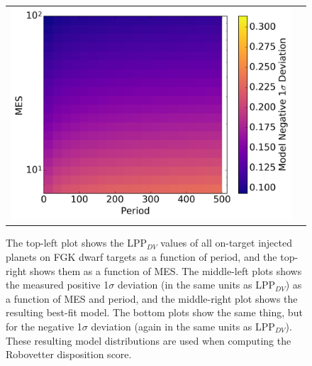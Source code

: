 \begin{figure}[hbtp]
\begin{tabular}{cc}
\includegraphics[width=0.5\linewidth]{ScoreFig-6.png}
\end{tabular}
\caption{The top-left plot shows the LPP$_{DV}$ values of all on-target injected planets on FGK dwarf targets as a function of period, and the top-right shows them as a function of MES. The middle-left plots shows the measured positive 1$\sigma$ deviation (in the same units as LPP$_{DV}$) as a function of MES and period, and the middle-right plot shows the resulting best-fit model. The bottom plots show the same thing, but for the negative 1$\sigma$ deviation (again in the same units as LPP$_{DV}$). These resulting model distributions are used when computing the Robovetter disposition score.}
\label{score-fig-1}
\end{figure}

